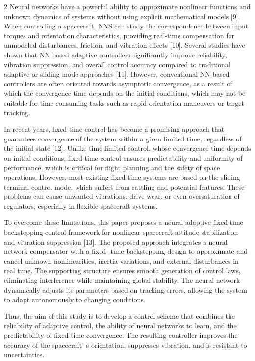 \begin{multicols}{2}
Neural networks have a powerful ability to approximate nonlinear
functions and unknown dynamics of systems without using explicit
mathematical models {[}9{]}. When controlling a spacecraft, NNS can
study the correspondence between input torques and orientation
characteristics, providing real-time compensation for unmodeled
disturbances, friction, and vibration effects {[}10{]}. Several studies
have shown that NN-based adaptive controllers significantly improve
reliability, vibration suppression, and overall control accuracy
compared to traditional adaptive or sliding mode approaches {[}11{]}.
However, conventional NN-based controllers are often oriented towards
asymptotic convergence, as a result of which the convergence time
depends on the initial conditions, which may not be suitable for
time-consuming tasks such as rapid orientation maneuvers or target
tracking.

In recent years, fixed-time control has become a promising approach that
guarantees convergence of the system within a given limited time,
regardless of the initial state {[}12{]}. Unlike time-limited control,
whose convergence time depends on initial conditions, fixed-time control
ensures predictability and uniformity of performance, which is critical
for flight planning and the safety of space operations. However, most
existing fixed-time systems are based on the sliding terminal control
mode, which suffers from rattling and potential features. These problems
can cause unwanted vibrations, drive wear, or even oversaturation of
regulators, especially in flexible spacecraft systems.

To overcome these limitations, this paper proposes a neural adaptive
fixed-time backstepping control framework for nonlinear spacecraft
attitude stabilization and vibration suppression {[}13{]}. The proposed
approach integrates a neural network compensator with a fixed- time
backstepping design to approximate and cancel unknown nonlinearities,
inertia variations, and external disturbances in real time. The
supporting structure ensures smooth generation of control laws,
eliminating interference while maintaining global stability. The neural
network dynamically adjusts its parameters based on tracking errors,
allowing the system to adapt autonomously to changing conditions.

Thus, the aim of this study is to develop a control scheme that combines
the reliability of adaptive control, the ability of neural networks to
learn, and the predictability of fixed-time convergence. The resulting
controller improves the accuracy of the spacecraft' s
orientation, suppresses vibration, and is resistant to uncertainties.


\end{multicols}
